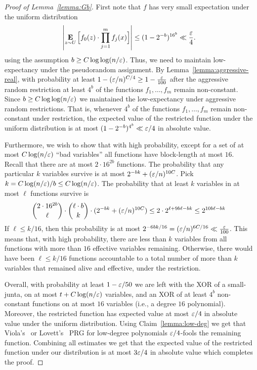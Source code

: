 \begin{proof}[Proof of Lemma~\ref{lemma:Gb}]
First note that $f$ has very small expectation under the uniform distribution
$$
\left|\mathop{\bf E\/}_{z\sim U}\Big[f_0(z) \cdot \prod_{j=1}^{m} f_j(x)\Big]
\right| \le (1-2^{-b})^{16^{b}} \ll \frac{\varepsilon}{4}.
$$
using the assumption $b\ge C \log \log(n/\varepsilon)$.
Thus, we need to maintain  low-expectancy under the pseudorandom assignment.
By Lemma~\ref{lemma:aggressive-real}, with probability at least $1-(\varepsilon/n)^{C/4}\ge 1-\frac{\varepsilon}{100}$ after the aggressive random restriction at least $4^{b}$ of the functions $f_1, \ldots, f_m$ remain non-constant. Since $b\ge C \log\log(n/\varepsilon)$ we maintained the low-expectancy under aggressive random restrictions. That is, whenever $4^{b}$ of the functions $f_1, \ldots, f_m$ remain non-constant under restriction, the expected value of the restricted function under the uniform distribution is at most $(1-2^{-b})^{4^b} \ll \varepsilon/4$ in absolute value.

Furthermore, we wish to show that with high probability, except for a set of at most $C\log (n/\varepsilon)$ ``bad variables'' all functions have block-length at most $16$.
Recall that there are at most $2\cdot 16^{2b}$ functions.
The probability that any particular $k$ variables survive is at most $2^{-b k} + (\varepsilon/n)^{10C}$.
Pick $k = C \log(n/\varepsilon)/b \le C \log(n/\varepsilon)$.
The probability that at least $k$ variables in at most $\ell$ functions survive is 
$$
\binom{2\cdot 16^{2b}}{\ell} \cdot \binom{\ell \cdot b}{k} \cdot (2^{-b k} + (\varepsilon/n)^{10C})
\le 2 \cdot 2^{\ell + 9b\ell - bk} \le 2^{10b\ell-bk}
$$
If $\ell \le k/16$, then this probability is at most $2^{-6bk/16} = (\varepsilon/n)^{6C/16} \ll \frac{\varepsilon}{100}$.
This means that, with high probability, there are less than $k$ variables from all functions with more than $16$ effective variables remaining.
Otherwise, there would have been $\ell \le k/16$ functions accountable to a total number of more than $k$ variables that remained alive and effective, under the restriction.

Overall, with probability at least $1-\varepsilon/50$ we are left with the XOR of a small-junta, on at most $t + C\log(n/\varepsilon)$ variables, and an XOR of at least $4^b$ non-constant functions on at most $16$ variables (i.e., a degree $16$ polynomial). Moreover, the restricted function has expected value at most $\varepsilon/4$ in absolute value under the uniform distribution.
Using Claim~\ref{lemma:low-deg} we get that Viola's~\cite{Viola08} or Lovett's~\cite{Lovett08} PRG for low-degree polynomials $\varepsilon/4$-fools the remaining function. Combining all estimates we get that the expected value of the restricted function under our distribution is at most $3\varepsilon/4$ in absolute value which completes the proof.
\end{proof}

